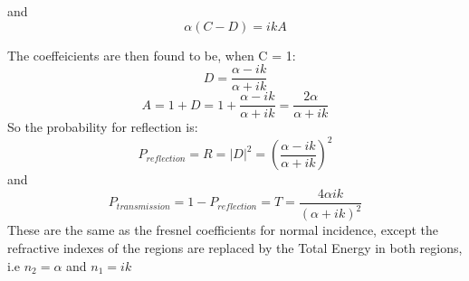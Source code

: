 \documentclass{article}
\begin{document}
and
\begin{equation}
\alpha(C - D) = ikA
\label{condition2}
\end{equation}

The coeffeicients are then found to be, when C = 1:
\begin{equation}
D = \frac{\alpha - ik}{\alpha + ik}
\end{equation}
\begin{equation}
A = 1 + D = 1 + \frac{\alpha - ik}{\alpha + ik} = \frac{2\alpha}{\alpha + ik}
\end{equation}
So the probability for reflection is:
$$ P_{reflection} = R = |D|^2 = (\frac{\alpha-ik}{\alpha + ik})^2 $$
and
$$ P_{transmission} =  1 - P_{reflection} = T =  \frac{4\alpha ik}{(\alpha + ik)^2}$$
These are the same as the fresnel coefficients for normal incidence, except the refractive indexes of the regions are replaced by the Total Energy in both regions, i.e $n_2 = \alpha $ and $n_1 = ik$
\end{document}
